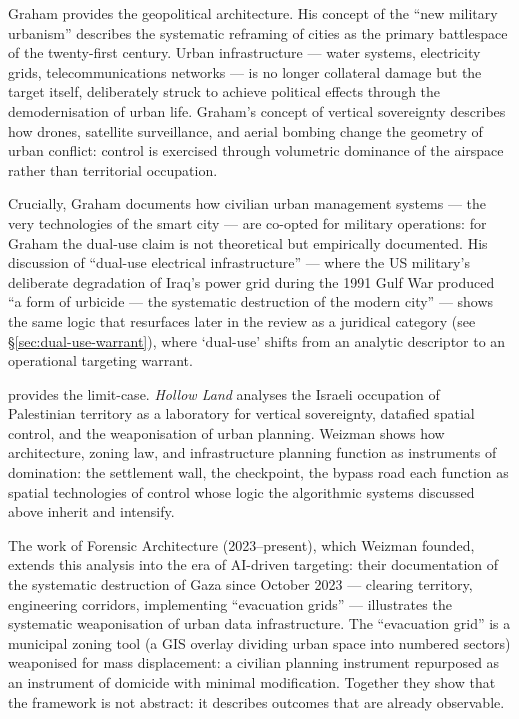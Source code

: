 \documentclass[12pt,a4paper,twoside]{report}
\begin{document}
Graham \citeyearpar{graham2006,graham2011} provides the geopolitical architecture. His concept of the ``new military urbanism'' \citeyearpar[p.~1]{graham2011} describes the systematic reframing of cities as the primary battlespace of the twenty-first century. Urban infrastructure — water systems, electricity grids, telecommunications networks — is no longer collateral damage but the target itself, deliberately struck to achieve political effects through the demodernisation of urban life. Graham's concept of vertical sovereignty describes how drones, satellite surveillance, and aerial bombing change the geometry of urban conflict: control is exercised through volumetric dominance of the airspace rather than territorial occupation.

Crucially, Graham documents how civilian urban management systems — the very technologies of the smart city — are co-opted for military operations: for Graham the dual-use claim is not theoretical but empirically documented. His discussion of ``dual-use electrical infrastructure'' — where the US military's deliberate degradation of Iraq's power grid during the 1991 Gulf War produced ``a form of urbicide — the systematic destruction of the modern city'' \parencite[pp.~1,~355]{graham2011} — shows the same logic that resurfaces later in the review as a juridical category (see §\ref{sec:dual-use-warrant}), where `dual-use' shifts from an analytic descriptor to an operational targeting warrant.

\textcite{weizman2007} provides the limit-case. \textit{Hollow Land} analyses the Israeli occupation of Palestinian territory as a laboratory for vertical sovereignty, datafied spatial control, and the weaponisation of urban planning. Weizman shows how architecture, zoning law, and infrastructure planning function as instruments of domination: the settlement wall, the checkpoint, the bypass road each function as spatial technologies of control whose logic the algorithmic systems discussed above inherit and intensify.

The work of Forensic Architecture (2023–present), which Weizman founded, extends this analysis into the era of AI-driven targeting: their documentation of the systematic destruction of Gaza since October 2023 — clearing territory, engineering corridors, implementing ``evacuation grids'' — illustrates the systematic weaponisation of urban data infrastructure. The ``evacuation grid'' is a municipal zoning tool (a GIS overlay dividing urban space into numbered sectors) weaponised for mass displacement: a civilian planning instrument repurposed as an instrument of domicide with minimal modification. Together they show that the framework is not abstract: it describes outcomes that are already observable.
\end{document}

